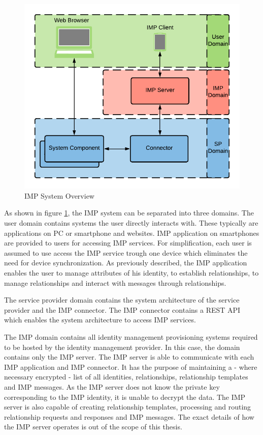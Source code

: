 \begin{figure}[H]
    \centering
    \includegraphics[scale=0.6]{Diagrams/IMP System Overview.pdf}
    \caption{IMP System Overview}
    \label{imp:imp_system_overview}
\end{figure}

As shown in figure \ref{imp:imp_system_overview}, the IMP system can be separated into three domains. The user domain contains systems the user directly interacts with. These typically are applications on PC or smartphone and websites. IMP application on smartphones are provided to users for accessing IMP services. For simplification, each user is assumed to use access the IMP service trough one device which eliminates the need for device synchronization. As previously described, the IMP application enables the user to manage attributes of his identity, to establish relationships, to manage relationships and interact with messages through relationships. 

The service provider domain contains the system architecture of the service provider and the IMP connector. The IMP connector contains a REST API which enables the system architecture to access IMP services.

The IMP domain contains all identity management provisioning systems required to be hosted by the identity management provider. In this case, the domain contains only the IMP server. The IMP server is able to communicate with each IMP application and IMP connector. It has the purpose of maintaining a - where necessary encrypted - list of all identities, relationships, relationship templates and IMP messages. As the IMP server does not know the private key corresponding to the IMP identity, it is unable to decrypt the data. The IMP server is also capable of creating relationship templates, processing and routing relationship requests and responses and IMP messages. The exact details of how the IMP server operates is out of the scope of this thesis.

